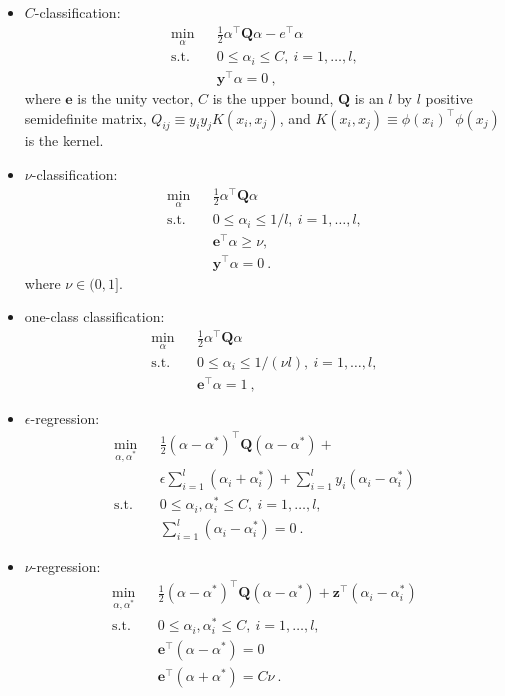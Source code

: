\documentclass[a4paper]{article}
\begin{document}
\begin{itemize}
 \item $C$-classification:\\
  \begin{eqnarray}
    \min_\alpha&&\frac{1}{2}\alpha^\top \mathbf{Q} \alpha-e^\top\alpha \nonumber\\
    \mbox{s.t.} &&0\le\alpha_i\le C,~i=1,\ldots,l,\\
    &&\mathbf{y}^\top\alpha=0~, \nonumber
  \end{eqnarray}
  where $\mathbf{e}$ is the unity vector, $C$ is the upper bound, $\mathbf{Q}$ is an $l$
  by $l$ positive semidefinite matrix, $Q_{ij} \equiv y_i y_j K(x_i,
  x_j)$, and $K(x_i, x_j) \equiv \phi(x_i)^\top\phi(x_j)$ is the
  kernel.
 \item $\nu$-classification:\\
  \begin{eqnarray}
    \min_\alpha&&\frac{1}{2}\alpha^\top \mathbf{Q} \alpha \nonumber\\
    \mbox{s.t.}&&0\le\alpha_i\le 1/l,~i=1,\ldots,l,\\
    &&\mathbf{e}^\top \alpha \ge \nu, \nonumber\\
    &&\mathbf{y}^\top\alpha=0~. \nonumber
  \end{eqnarray}
  where $\nu \in (0,1]$.
 \item one-class classification:\\
  \begin{eqnarray}
    \min_\alpha&&\frac{1}{2}\alpha^\top \mathbf{Q} \alpha \nonumber\\
    \mbox{s.t.} &&0\le\alpha_i\le 1/(\nu l),~i=1,\ldots,l,\\
    &&\mathbf{e}^\top\alpha=1~,\nonumber
  \end{eqnarray}
 \item $\epsilon$-regression:\\
  \begin{eqnarray}
    \min_{\alpha, \alpha^*}&&\frac{1}{2}(\alpha-\alpha^*)^\top \mathbf{Q}
    (\alpha-\alpha^*) +  \nonumber\\
    &&\epsilon\sum_{i=1}^{l}(\alpha_i+\alpha_i^*) + \sum_{i=1}^{l}y_i(\alpha_i-\alpha_i^*) \nonumber\\
    \mbox{s.t.} &&0\le\alpha_i, \alpha_i^*\le C,~i=1,\ldots,l,\\
    &&\sum_{i=1}^{l}(\alpha_i-\alpha_i^*)=0~.\nonumber
  \end{eqnarray}
 \item $\nu$-regression:\\
  \begin{eqnarray}
    \min_{\alpha, \alpha^*}&&\frac{1}{2}(\alpha-\alpha^*)^\top \mathbf{Q}
    (\alpha-\alpha^*) + \mathbf{z}^\top(\alpha_i-\alpha_i^*) \nonumber\\
    \mbox{s.t.} &&0\le\alpha_i, \alpha_i^*\le C,~i=1,\ldots,l,\\
    &&\mathbf{e}^\top(\alpha-\alpha^*)=0\nonumber\\
    &&\mathbf{e}^\top(\alpha+\alpha^*)=C\nu~.\nonumber
  \end{eqnarray}
  
\end{itemize}
\end{document}
